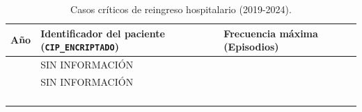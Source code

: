 \begin{table}[htbp]
\centering
\scriptsize
\setlength{\tabcolsep}{4pt}
\renewcommand{\arraystretch}{1.2}
\caption{Casos críticos de reingreso hospitalario (2019-2024).}
\label{tab:reingresos_pacientes}
\begin{tabular}{|c|l|l|}
\hline
\parbox[t]{1.2cm}{\centering\textbf{Año}} & 
\parbox[t]{5cm}{\centering\textbf{Identificador del paciente (\texttt{CIP\_ENCRIPTADO})}} & 
\parbox[t]{3.5cm}{\centering\textbf{Frecuencia máxima (Episodios)}} \\ \hline

\parbox[t]{1.2cm}{} & \parbox[t]{5cm}{\centering SIN INFORMACIÓN} & \parbox[t]{3.5cm}{} \\ \hline
\parbox[t]{1.2cm}{} & \parbox[t]{5cm}{\centering SIN INFORMACIÓN} & \parbox[t]{3.5cm}{} \\ \hline
\parbox[t]{1.2cm}{} & \parbox[t]{5cm}{} & \parbox[t]{3.5cm}{} \\ \hline
\parbox[t]{1.2cm}{} & \parbox[t]{5cm}{} & \parbox[t]{3.5cm}{} \\ \hline
\parbox[t]{1.2cm}{} & \parbox[t]{5cm}{} & \parbox[t]{3.5cm}{} \\ \hline
\parbox[t]{1.2cm}{} & \parbox[t]{5cm}{} & \parbox[t]{3.5cm}{} \\ \hline
\end{tabular}
\end{table}

